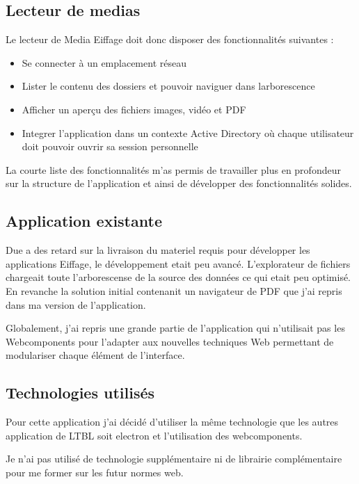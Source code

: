 \subsection{Lecteur de medias}

Le lecteur de Media Eiffage doit donc disposer des fonctionnalités suivantes :

\begin{itemize}
    \item Se connecter à un emplacement réseau
    \item Lister le contenu des dossiers et pouvoir naviguer dans larborescence
    \item Afficher un aperçu des fichiers images, vidéo et PDF
    \item Integrer l'application dans un contexte Active Directory où chaque utilisateur doit pouvoir ouvrir sa session personnelle
\end{itemize}

La courte liste des fonctionnalités m'as permis de travailler plus en profondeur sur la structure de l'application et ainsi de développer des fonctionnalités solides.

\subsection{Application existante}

Due a des retard sur la livraison du materiel requis pour développer les applications Eiffage, le développement etait peu avancé.
L'explorateur de fichiers chargeait toute l'arborescense de la source des données ce qui etait peu optimisé.
En revanche la solution initial contenanit un navigateur de PDF que j'ai repris dans ma version de l'application.

Globalement, j'ai repris une grande partie de l'application qui n'utilisait pas les Webcomponents pour l'adapter aux nouvelles techniques Web permettant de modulariser chaque élément de l'interface.

\subsection{Technologies utilisés}

Pour cette application j'ai décidé d'utiliser la même technologie que les autres application de LTBL soit electron et l'utilisation des webcomponents.

Je n'ai pas utilisé de technologie supplémentaire ni de librairie complémentaire pour me former sur les futur normes web.

